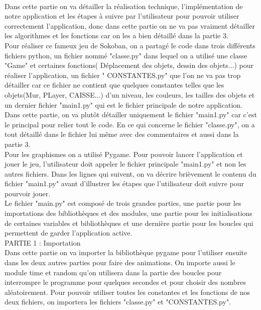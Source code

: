 \documentclass{article}
\begin{document}
\paragraph{} Dans cette partie on va détailler la réalisation technique, l'implémentation de notre application et les étapes à suivre par l'utilisateur pour pouvoir utiliser correctement l'application, donc dans cette partie on ne va pas vraiment détailler les algorithmes et les fonctions car on les a bien détaillé dans la partie 3.\\
Pour réaliser ce fameux jeu de Sokoban, on a partagé le code dans trois différents fichiers python, un fichier nommé "classe.py" dans lequel on a utilisé une classe "Game" et certaines fonctions( Déplacement des objets, dessin des objets...) pour réaliser l'application, un fichier " CONSTANTES.py" que l'on ne va pas trop détailler car ce fichier ne contient que quelques constantes telles que les objets(Mur, PLayer, CAISSE...) d'un niveau, les couleurs, les tailles des objets et un dernier fichier "main1.py" qui est le fichier principale de notre application.\\
Dans cette partie, on va plutôt détailler uniquement le fichier "main1.py" car c'est le principal pour relier tout le code. En ce qui concerne le fichier "classe.py", on a tout détaillé dans le fichier lui même avec des commentaires et aussi dans la partie 3.\\
Pour les graphismes on a utilisé Pygame. Pour pouvoir lancer l'application et jouer le jeu, l'utilisateur doit appeler le fichier principale "main1.py" et non les autres fichiers. Dans les lignes qui suivent, on va décrire brièvement le contenu du fichier "main1.py" avant d'illustrer les étapes que l'utilisateur doit suivre pour pourvoir jouer.\\
Le fichier "main.py" est composé de trois grandes parties, une partie pour les importations des bibliothèques et des modules, une partie pour les initialisations de certaines variables et bibliothèques et une dernière partie pour les boucles qui permettent de garder l'application active.\\

					PARTIE 1 : Importation\\
					
Dans cette partie on va importer la bibliothèque pygame pour l'utiliser ensuite dans les deux autres parties pour faire des animations. On importe aussi le module time et random qu'on utilisera dans la partie des boucles pour interrompre le programme pour quelques secondes et pour choisir des nombres aléatoirement.
Pour pouvoir utiliser toutes les constantes et les fonctions de nos deux fichiers, on importera les fichiers "classe.py" et "CONSTANTES.py".\\
\end{document}
